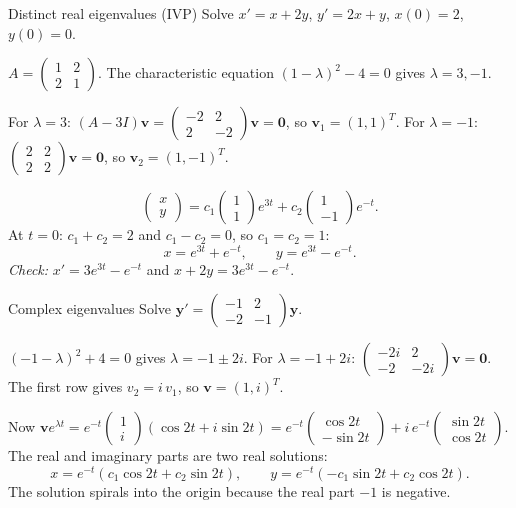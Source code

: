 \begin{examplebox}{Distinct real eigenvalues (IVP)}
Solve $x' = x + 2y$, \; $y' = 2x + y$, \; $x(0)=2$, \; $y(0)=0$.

$A = \begin{pmatrix}1&2\\2&1\end{pmatrix}$. The characteristic equation $(1-\lambda)^2 - 4 = 0$ gives $\lambda = 3, -1$.

For $\lambda=3$: $(A-3I)\mathbf{v} = \begin{pmatrix}-2&2\\2&-2\end{pmatrix}\mathbf{v}=\mathbf 0$, so $\mathbf{v}_1 = (1,1)^T$.
For $\lambda=-1$: $\begin{pmatrix}2&2\\2&2\end{pmatrix}\mathbf{v} = \mathbf 0$, so $\mathbf{v}_2 = (1,-1)^T$.

\[ \begin{pmatrix}x\\y\end{pmatrix} = c_1\begin{pmatrix}1\\1\end{pmatrix}e^{3t} + c_2\begin{pmatrix}1\\-1\end{pmatrix}e^{-t}. \]
At $t=0$: $c_1 + c_2 = 2$ and $c_1 - c_2 = 0$, so $c_1 = c_2 = 1$:
\[ x = e^{3t} + e^{-t}, \qquad y = e^{3t} - e^{-t}. \]
\textit{Check:} $x' = 3e^{3t} - e^{-t}$ and $x + 2y = 3e^{3t} - e^{-t}$. \checkmark
\end{examplebox}

\begin{examplebox}{Complex eigenvalues}
Solve $\mathbf{y}' = \begin{pmatrix}-1 & 2\\ -2 & -1\end{pmatrix}\mathbf{y}$.

$(-1-\lambda)^2 + 4 = 0$ gives $\lambda = -1 \pm 2i$. For $\lambda = -1+2i$: $\begin{pmatrix}-2i & 2\\ -2 & -2i\end{pmatrix}\mathbf v = \mathbf 0$. The first row gives $v_2 = i\,v_1$, so $\mathbf{v} = (1, i)^T$.

Now $\mathbf{v}e^{\lambda t} = e^{-t}\begin{pmatrix}1\\ i\end{pmatrix}(\cos 2t + i\sin 2t) = e^{-t}\begin{pmatrix}\cos 2t\\ -\sin 2t\end{pmatrix} + i\,e^{-t}\begin{pmatrix}\sin 2t\\ \cos 2t\end{pmatrix}$. The real and imaginary parts are two real solutions:
\[ x = e^{-t}(c_1\cos 2t + c_2\sin 2t), \qquad y = e^{-t}(-c_1\sin 2t + c_2\cos 2t). \]
The solution spirals into the origin because the real part $-1$ is negative.
\end{examplebox}

